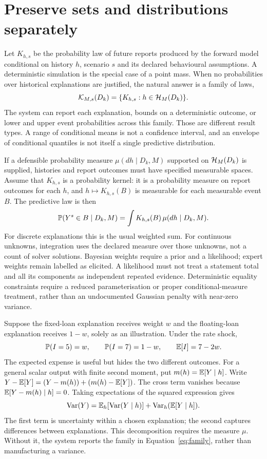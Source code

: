 \section{Preserve sets and distributions separately}

Let $K_{h,s}$ be the probability law of future reports produced by the forward
model conditional on history $h$, scenario $s$ and its declared behavioural
assumptions. A deterministic simulation is the special case of a point mass.
When no probabilities over historical explanations are justified, the natural
answer is a family of laws,
\begin{equation}\label{eq:family}
 \mathcal{K}_{M,s}(D_k)=\{K_{h,s}:h\in\mathcal{H}_M(D_k)\}.
\end{equation}
The system can report each explanation, bounds on a deterministic outcome,
or lower and upper event probabilities across this family. Those are different
result types. A range of conditional means is not a confidence interval, and
an envelope of conditional quantiles is not itself a single predictive
distribution.

If a defensible probability measure $\mu(dh\mid D_k,M)$ supported on
$\mathcal{H}_M(D_k)$ is supplied, histories and report outcomes must have specified
measurable spaces. Assume that $K_{h,s}$ is a probability kernel: it is a
probability measure on report outcomes for each $h$, and $h\mapsto K_{h,s}(B)$
is measurable for each measurable event $B$. The predictive law is then
\begin{equation}\label{eq:mixture}
 \mathbb{P}(Y^s\in B\mid D_k,M)=
 \int K_{h,s}(B)\,\mu(dh\mid D_k,M).
\end{equation}
For discrete explanations this is the usual weighted sum. For continuous
unknowns, integration uses the declared measure over those unknowns, not a
count of solver solutions. Bayesian weights require a prior and a likelihood;
expert weights remain labelled as elicited. A likelihood must not treat a
statement total and all its components as independent repeated evidence.
Deterministic equality constraints require a reduced parameterisation or
proper conditional-measure treatment, rather than an undocumented Gaussian
penalty with near-zero variance.

Suppose the fixed-loan explanation receives weight $w$ and the floating-loan
explanation receives $1-w$, solely as an illustration. Under the rate shock,
\[
 \mathbb{P}(I=5)=w,\qquad\mathbb{P}(I=7)=1-w,
 \qquad\mathbb{E}[I]=7-2w.
\]
The expected expense is useful but hides the two different outcomes. For a
general scalar output with finite second moment, put $m(h)=\mathbb{E}[Y\mid h]$.
Write $Y-\mathbb{E}[Y]=(Y-m(h))+(m(h)-\mathbb{E}[Y])$. The cross term vanishes because
$\mathbb{E}[Y-m(h)\mid h]=0$. Taking expectations of the squared expression gives
\begin{equation}\label{eq:variance}
 \operatorname{Var}(Y)=
 \mathbb{E}_h[\operatorname{Var}(Y\mid h)]+
 \operatorname{Var}_h(\mathbb{E}[Y\mid h]).
\end{equation}
The first term is uncertainty within a chosen explanation; the second captures
differences between explanations. This decomposition requires the measure
$\mu$. Without it, the system reports the family in
Equation~\eqref{eq:family}, rather than manufacturing a variance.

